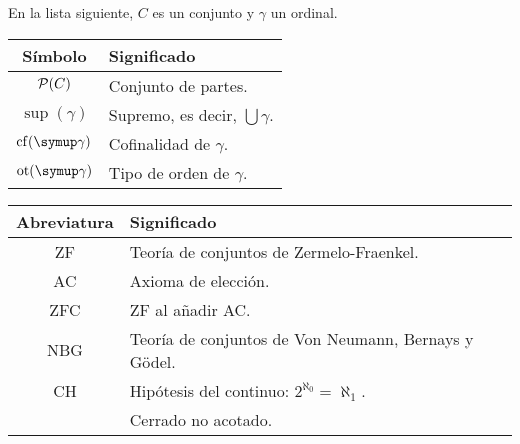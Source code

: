 En la lista siguiente, $C$ es un conjunto y $\gamma$ un ordinal.

\begin{center}
    \begin{tabular}{cl}
        Símbolo & Significado \\
        \hline\noalign{\smallskip}
        $\pwset{C}$ & Conjunto de partes.\\
        $\sup(\gamma)$ & Supremo, es decir, $\bigcup \gamma$.\\
        $\cf(\gamma)$ & Cofinalidad de $\gamma$.\\
        $\ot(\gamma)$ & Tipo de orden de $\gamma$.
    \end{tabular}
\end{center}

\newpage
{}

\begin{center}
    \begin{tabular}{cl}
        Abreviatura & Significado \\
        \hline\noalign{\smallskip}
        ZF & Teoría de conjuntos de Zermelo-Fraenkel.\\
        AC & Axioma de elección.\\
        ZFC & ZF al añadir AC.\\
        NBG & Teoría de conjuntos de Von Neumann, Bernays y Gödel.\\
        CH & Hipótesis del continuo: $2^{\aleph_0} = \aleph_1$. \\
        \cna{} & Cerrado no acotado. \\
    \end{tabular}
\end{center}
\fi
\mainmatter
\pagestyle{headings}
\makeatletter
\gdef\@oddhead{\hfil\thepage}
\makeatother
\ifintro
{}
\thispagestyle{empty}

